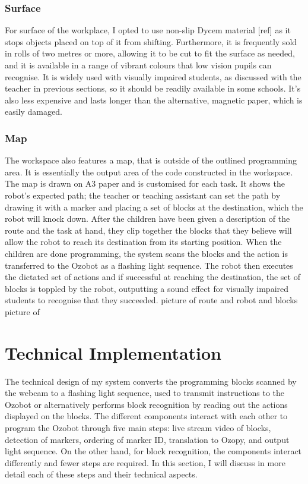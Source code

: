 \documentclass[oneside,%
                    author={Malak Hajji},
                    degree={BSc},
                    title={Designing An Accessible Computational Toolkit For Students},
                  subtitle={With Mixed Visual Abilities}]{dissertation}
\begin{document}
\subsubsection{Surface}
For surface of the workplace, I opted to use non-slip Dycem material [ref] as it stops objects placed on top of it from shifting. Furthermore, it is frequently sold in rolls of two metres or more, allowing it to be cut to fit the surface as needed, and it is available in a range of vibrant colours that low vision pupils can recognise. It is widely used with visually impaired students, as discussed with the teacher in previous sections, so it should be readily available in some schools. It's also less expensive and lasts longer than the alternative, magnetic paper, which is easily damaged.
\subsubsection{Map}
The workspace also features a map, that is outside of the outlined programming area. It is essentially the output area of the code constructed in the workspace. 
The map is drawn on A3 paper and is customised for each task. It shows the robot's expected path; the teacher or teaching assistant can set the path by drawing it with a marker and placing a set of blocks at the destination, which the robot will knock down. After the children have been given a description of the route and the task at hand, they clip together the blocks that they believe will allow the robot to reach its destination from its starting position. When the children are done programming, the system scans the blocks and the action is transferred to the Ozobot as a flashing light sequence. The robot then executes the dictated set of actions and if successful at reaching the destination, the set of blocks is toppled by the robot, outputting a sound effect for visually impaired students to recognise that they succeeded. 
picture of route and robot and blocks 
picture of
\section{Technical Implementation}
The technical design of my system converts the programming blocks scanned by the webcam to a flashing light sequence, used to transmit instructions to the Ozobot or alternatively performs block recognition by reading out the actions displayed on the blocks. The different components interact with each other to program the Ozobot through five main steps: live stream video of blocks, detection of markers, ordering of marker ID, translation to Ozopy, and output light sequence. On the other hand, for block recognition, the components interact differently and fewer steps are required. In this section, I will discuss in more detail each of these steps and their technical aspects. 
 
\end{document}
